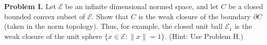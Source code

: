 \textbf{Problem I.} Let $\mathcal{E}$ be an infinite dimensional normed space, and let $C$ be a closed bounded convex subset of $\mathcal{E}$. Show that $C$ is the weak closure of the boundary $\partial C$ (taken in the norm topology). Thus, for example, the closed unit ball $\mathcal{E}_1$ is the weak closure of the unit sphere $\{x \in \mathcal{E}: \|x\| = 1\}$. (Hint: Use Problem H.)
